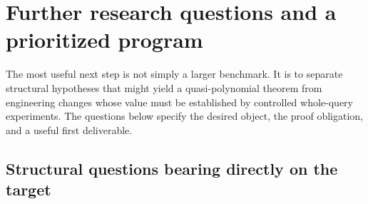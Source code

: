 \section{Further research questions and a prioritized program}
\label{sec:agenda}

The most useful next step is not simply a larger benchmark. It is to
separate structural hypotheses that might yield a quasi-polynomial theorem
from engineering changes whose value must be established by controlled
whole-query experiments. The questions below specify the desired object,
the proof obligation, and a useful first deliverable.

\subsection{Structural questions bearing directly on the target}

